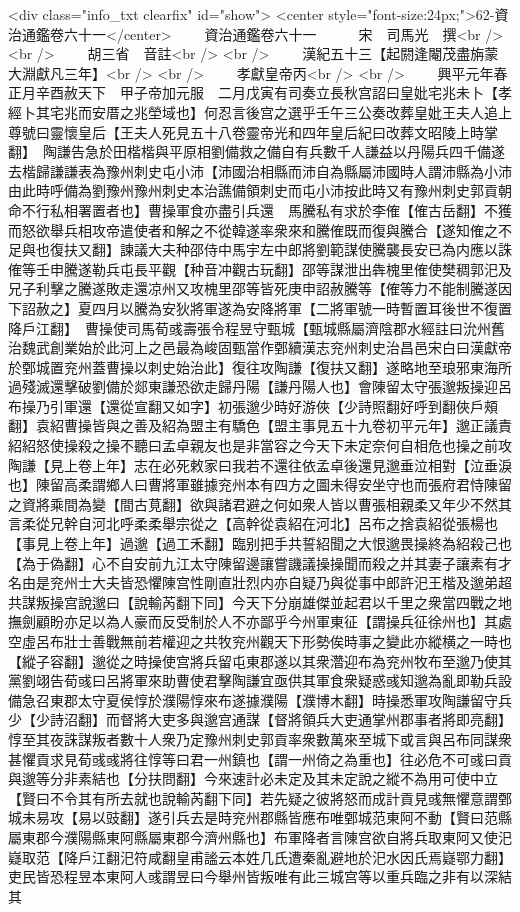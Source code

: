<div class="info_txt clearfix" id="show">
<center style="font-size:24px;">62-資治通鑑卷六十一</center>
  　　資治通鑑卷六十一　　　宋　司馬光　撰<br />
<br />
　　胡三省　音註<br />
<br />
　　漢紀五十三【起閼逢閹茂盡旃蒙大淵獻凡三年】<br />
<br />
　　孝獻皇帝丙<br />
<br />
　　興平元年春正月辛酉赦天下　甲子帝加元服　二月戊寅有司奏立長秋宫詔曰皇妣宅兆未卜【孝經卜其宅兆而安厝之兆塋域也】何忍言後宫之選乎壬午三公奏改葬皇妣王夫人追上尊號曰靈懷皇后【王夫人死見五十八卷靈帝光和四年皇后紀曰改葬文昭陵上時掌翻】　陶謙告急於田楷楷與平原相劉備救之備自有兵數千人謙益以丹陽兵四千備遂去楷歸謙謙表為豫州刺史屯小沛【沛國治相縣而沛自為縣屬沛國時人謂沛縣為小沛由此時呼備為劉豫州豫州刺史本治譙備領刺史而屯小沛按此時又有豫州刺史郭貢朝命不行私相署置者也】曹操軍食亦盡引兵還　馬騰私有求於李傕【傕古岳翻】不獲而怒欲舉兵相攻帝遣使者和解之不從韓遂率衆來和騰傕既而復與騰合【遂知傕之不足與也復扶又翻】諫議大夫种邵侍中馬宇左中郎將劉範謀使騰襲長安已為内應以誅傕等壬申騰遂勒兵屯長平觀【种音冲觀古玩翻】邵等謀泄出犇槐里傕使樊稠郭汜及兄子利擊之騰遂敗走還凉州又攻槐里邵等皆死庚申詔赦騰等【傕等力不能制騰遂因下詔赦之】夏四月以騰為安狄將軍遂為安降將軍【二將軍號一時暫置耳後世不復置降戶江翻】　曹操使司馬荀彧壽張令程昱守甄城【甄城縣屬濟陰郡水經註曰沇州舊治魏武創業始於此河上之邑最為峻固甄當作鄄續漢志兖州刺史治昌邑宋白曰漢獻帝於鄄城置兖州蓋曹操以刺史始治此】復往攻陶謙【復扶又翻】遂略地至琅邪東海所過殘滅還擊破劉備於郯東謙恐欲走歸丹陽【謙丹陽人也】會陳留太守張邈叛操迎呂布操乃引軍還【還從宣翻又如字】初張邈少時好游俠【少詩照翻好呼到翻俠戶頰翻】袁紹曹操皆與之善及紹為盟主有驕色【盟主事見五十九卷初平元年】邈正議責紹紹怒使操殺之操不聽曰孟卓親友也是非當容之今天下未定奈何自相危也操之前攻陶謙【見上卷上年】志在必死敕家曰我若不還往依孟卓後還見邈垂泣相對【泣垂淚也】陳留高柔謂鄉人曰曹將軍雖據兖州本有四方之圖未得安坐守也而張府君恃陳留之資將乘間為變【間古莧翻】欲與諸君避之何如衆人皆以曹張相親柔又年少不然其言柔從兄幹自河北呼柔柔舉宗從之【高幹從袁紹在河北】呂布之捨袁紹從張楊也【事見上卷上年】過邈【過工禾翻】臨别把手共誓紹聞之大恨邈畏操終為紹殺己也【為于偽翻】心不自安前九江太守陳留邊讓嘗譏議操操聞而殺之并其妻子讓素有才名由是兖州士大夫皆恐懼陳宫性剛直壯烈内亦自疑乃與從事中郎許汜王楷及邈弟超共謀叛操宫說邈曰【說輸芮翻下同】今天下分崩雄傑並起君以千里之衆當四戰之地撫劍顧盼亦足以為人豪而反受制於人不亦鄙乎今州軍東征【謂操兵征徐州也】其處空虛呂布壯士善戰無前若權迎之共牧兖州觀天下形勢俟時事之變此亦縱横之一時也【縱子容翻】邈從之時操使宫將兵留屯東郡遂以其衆濳迎布為兖州牧布至邈乃使其黨劉翊告荀彧曰呂將軍來助曹使君擊陶謙宜亟供其軍食衆疑惑彧知邈為亂即勒兵設備急召東郡太守夏侯惇於濮陽惇來布遂據濮陽【濮博木翻】時操悉軍攻陶謙留守兵少【少詩沼翻】而督將大吏多與邈宫通謀【督將領兵大吏通掌州郡事者將即亮翻】惇至其夜誅謀叛者數十人衆乃定豫州刺史郭貢率衆數萬來至城下或言與呂布同謀衆甚懼貢求見荀彧彧將往惇等曰君一州鎮也【謂一州倚之為重也】往必危不可彧曰貢與邈等分非素結也【分扶問翻】今來速計必未定及其未定說之縱不為用可使中立【賢曰不令其有所去就也說輸芮翻下同】若先疑之彼將怒而成計貢見彧無懼意謂鄄城未易攻【易以豉翻】遂引兵去是時兖州郡縣皆應布唯鄄城范東阿不動【賢曰范縣屬東郡今濮陽縣東阿縣屬東郡今濟州縣也】布軍降者言陳宫欲自將兵取東阿又使汜嶷取范【降戶江翻汜符咸翻皇甫謐云本姓几氏遭秦亂避地於汜水因氏焉嶷鄂力翻】吏民皆恐程昱本東阿人彧謂昱曰今舉州皆叛唯有此三城宫等以重兵臨之非有以深結其